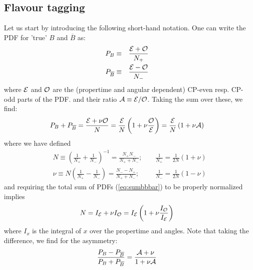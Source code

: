 \documentclass[a4paper,10pt,twosided]{article}
\begin{document}
\pagebreak
\subsection{Flavour tagging}

Let us start by introducing the following short-hand notation. One can write the 
PDF for 'true' $B$ and $\overline{B}$ as:
\begin{eqnarray}
   P_{B}           &\equiv&\frac{ {\cal E} + {\cal O}}{N_+} \\
   P_{\overline{B}} &\equiv&\frac{ {\cal E} - {\cal O}}{N_-}
\end{eqnarray}
where ${\cal E}$ and ${\cal O}$ are the (propertime and angular dependent) CP-even resp. CP-odd parts of the PDF.
and their ratio ${\cal A} \equiv {\cal E / O }$.
Taking the sum over these, we find:
\begin{equation}
   P_{B} + P_{\overline{B}} =  \frac{ {\cal E} + \nu{\cal O} }{N}  = \frac{\cal E} {N} \left( 1 + \nu \frac{ \cal O }{\cal E} \right) = \frac{\cal E}{N} \left(1 + \nu {\cal A}\right)
   \label{eq:sumbbbar}
\end{equation}
where we have defined
\begin{eqnarray}
   &  N \equiv \left( \frac{1}{N_+}+\frac{1}{N_-}\right)^{-1} = \frac{N_+N_-}{N_+ + N_-};\;\;\;\; &  \frac{1}{N_+} =\frac{1}{2N}(1+\nu) \\
   &\nu \equiv N \left( \frac{1}{N_+}-\frac{1}{N_-}\right) = \frac{N_- - N_+}{N_+ +N_-}; & \frac{1}{N_-} =\frac{1}{2N}(1-\nu) 
\end{eqnarray}
and requiring the total sum of PDFs (\ref{eq:sumbbbar}) to be properly normalized implies
\begin{equation}
   N = I_{\cal E} + \nu I_{\cal O} 
     = I_{\cal E} \left( 1 + \nu \frac{ I_{\cal O}}{I_{\cal E}}   \right)
\end{equation}
where $I_x$ is the integral of $x$ over the propertime and angles.
Note that taking the difference, we find for the asymmetry:
\begin{equation}
  \frac{P_{B} - P_{\overline{B}}}{P_{B} + P_{\overline{B}}} =  \frac{ {\cal A} + \nu}{1+\nu{\cal A}}
   \label{eq:difbbbar}
\end{equation}
\end{document}
